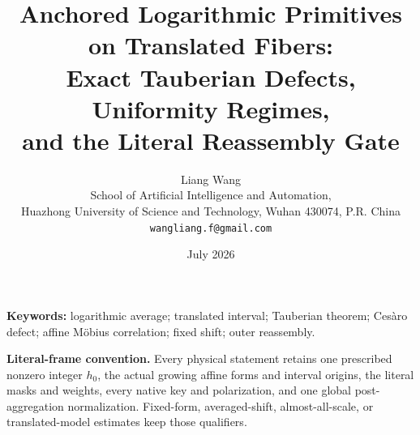 \documentclass[11pt]{article}
\title{Anchored Logarithmic Primitives on Translated Fibers:\\
Exact Tauberian Defects, Uniformity Regimes,\\
and the Literal Reassembly Gate}
\author{Liang Wang\\
School of Artificial Intelligence and Automation,\\
Huazhong University of Science and Technology, Wuhan 430074, P.R. China\\
\texttt{wangliang.f@gmail.com}}
\date{July 2026}
\theoremstyle{remark}
\begin{document}
\maketitle



\noindent\textbf{Keywords:} logarithmic average; translated interval;
Tauberian theorem; Ces\`aro defect; affine M\"obius correlation;
fixed shift; outer reassembly.

\medskip
\noindent\textbf{Literal-frame convention.}
Every physical statement retains one prescribed nonzero integer
\(h_0\), the actual growing affine forms and interval origins, the
literal masks and weights, every native key and polarization, and one
global post-aggregation normalization.  Fixed-form, averaged-shift,
almost-all-scale, or translated-model estimates keep those
qualifiers.










\begingroup
\footnotesize
\raggedright


\endgroup
\end{document}
